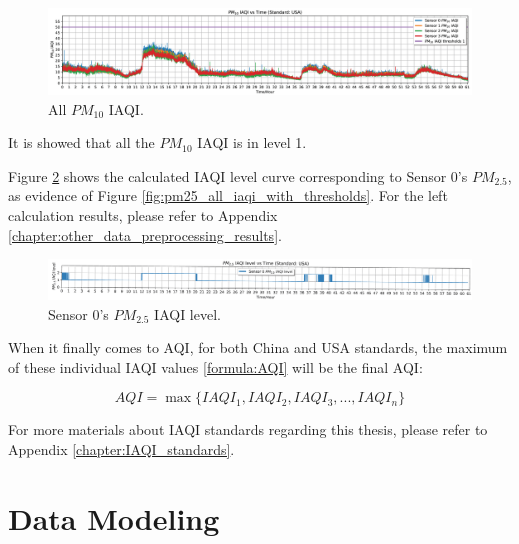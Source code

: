 \begin{figure}[!htbp]
    \begin{center}
        \includegraphics[width=\linewidth]{fig/iaqi/pm10_all_iaqi_with_thresholds.png}
    \end{center}
    \caption{All $PM_{10}$ IAQI.}
    \label{fig:pm10_all_iaqi_with_thresholds}
\end{figure}

It is showed that all the $PM_{10}$ IAQI is in level 1.

Figure \ref{fig:pm25_0_iaqi_level_dpi1200} shows the calculated IAQI level curve corresponding to Sensor 0's $PM_{2.5}$, as evidence of Figure \ref{fig:pm25_all_iaqi_with_thresholds}. For the left calculation results, please refer to Appendix \ref{chapter:other_data_preprocessing_results}.

\begin{figure}[!htbp]
    \begin{center}
        \includegraphics[width=\linewidth]{fig/iaqi_level/pm25_0_iaqi_level_dpi1200.png}
    \end{center}
    \caption{Sensor 0's $PM_{2.5}$ IAQI level.}
    \label{fig:pm25_0_iaqi_level_dpi1200}
\end{figure}

When it finally comes to AQI, for both China and USA standards, the maximum of these individual IAQI values \ref{formula:AQI} will be the final AQI:

\begin{equation}
    \label{formula:AQI}
    AQI = \max\{IAQI_1,IAQI_2,IAQI_3,...,IAQI_n\}
\end{equation}

For more materials about IAQI standards regarding this thesis, please refer to Appendix \ref{chapter:IAQI_standards}. 

\section{Data Modeling}

